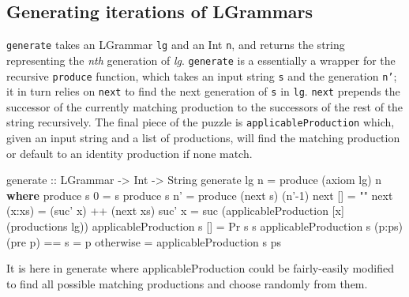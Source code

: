 \documentclass[]{article}
\newenvironment{Shaded}{}{}
\newcommand{\KeywordTok}[1]{\textcolor[rgb]{0.00,0.44,0.13}{\textbf{{#1}}}}
\newcommand{\DataTypeTok}[1]{\textcolor[rgb]{0.56,0.13,0.00}{{#1}}}
\newcommand{\DecValTok}[1]{\textcolor[rgb]{0.25,0.63,0.44}{{#1}}}
\newcommand{\StringTok}[1]{\textcolor[rgb]{0.25,0.44,0.63}{{#1}}}
\newcommand{\OtherTok}[1]{\textcolor[rgb]{0.00,0.44,0.13}{{#1}}}
\newcommand{\FunctionTok}[1]{\textcolor[rgb]{0.02,0.16,0.49}{{#1}}}
\newcommand{\NormalTok}[1]{{#1}}
\begin{document}
\subsection{Generating iterations of LGrammars}

\texttt{generate} takes an LGrammar \texttt{lg} and an Int \texttt{n},
and returns the string representing the \emph{nth} generation of
\emph{lg}. \texttt{generate} is a essentially a wrapper for the
recursive \texttt{produce} function, which takes an input string
\texttt{s} and the generation \texttt{n'}; it in turn relies on
\texttt{next} to find the next generation of \texttt{s} in \texttt{lg}.
\texttt{next} prepends the successor of the currently matching
production to the successors of the rest of the string recursively. The
final piece of the puzzle is \texttt{applicableProduction} which, given
an input string and a list of productions, will find the matching
production or default to an identity production if none match.

\begin{Shaded}
\begin{Highlighting}[]
\OtherTok{generate                ::} \DataTypeTok{LGrammar} \OtherTok{->} \DataTypeTok{Int} \OtherTok{->} \DataTypeTok{String}
\NormalTok{generate  lg n           }\FunctionTok{=} \NormalTok{produce (axiom lg) n}
    \KeywordTok{where} \NormalTok{produce s }\DecValTok{0}    \FunctionTok{=} \NormalTok{s}
          \NormalTok{produce s n'   }\FunctionTok{=} \NormalTok{produce (next s) (n'}\FunctionTok{-}\DecValTok{1}\NormalTok{)}
          \NormalTok{next []        }\FunctionTok{=} \StringTok{""}
          \NormalTok{next (x}\FunctionTok{:}\NormalTok{xs)    }\FunctionTok{=} \NormalTok{(suc' x) }\FunctionTok{++} \NormalTok{(next xs)}
          \NormalTok{suc' x }\FunctionTok{=} \NormalTok{suc (applicableProduction [x] (productions lg))}
          \NormalTok{applicableProduction s []     }\FunctionTok{=} \DataTypeTok{Pr} \NormalTok{s s}
          \NormalTok{applicableProduction s (p}\FunctionTok{:}\NormalTok{ps)}
              \FunctionTok{\textbar{}} \NormalTok{(pre p) }\FunctionTok{==} \NormalTok{s }\FunctionTok{=} \NormalTok{p}
              \FunctionTok{\textbar{}} \FunctionTok{otherwise}    \FunctionTok{=} \NormalTok{applicableProduction s ps}
\end{Highlighting}
\end{Shaded}
It is here in generate where applicableProduction could be fairly-easily
modified to find all possible matching productions and choose randomly
from them.
\end{document}
